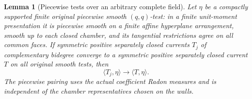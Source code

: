 \documentclass[11pt,a4paper]{article}
\numberwithin{equation}{section}
\newtheorem{lemma}[theorem]{Lemma}
\theoremstyle{definition}
\theoremstyle{remark}
\begin{document}
\begin{lemma}[Piecewise tests over an arbitrary complete field]
\label{lem:r5-prescribed-piecewise-tests}
Let $\eta$ be a compactly supported finite original piecewise smooth
$(q,q)$-test: in a finite unit-moment presentation it is piecewise
smooth on a finite affine hyperplane arrangement, smooth up to each
closed chamber, and its tangential restrictions agree on all common
faces. If symmetric positive separately closed currents $T_j$ of complementary
bidegree converge to a symmetric positive separately closed current $T$ on all
original smooth tests, then
\[
 \langle T_j,\eta\rangle\longrightarrow\langle T,\eta\rangle.
\]
The piecewise pairing uses the actual coefficient Radon measures and
is independent of the chamber representatives chosen on the walls.
\end{lemma}
\end{document}
